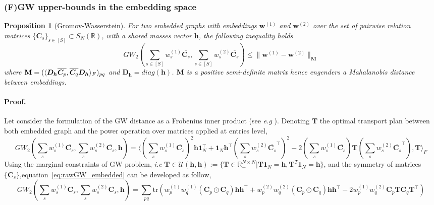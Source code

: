 \documentclass{article}
\newcommand{\scalar}[2]{\langle #1 , #2 \rangle}
\def\eqref#1{equation~\ref{#1}}
\def\vh{{\bm{h}}}
\def\vw{{\bm{w}}}
\def\mC{{\bm{C}}}
\def\mD{{\bm{D}}}
\def\mM{{\bm{M}}}
\def\mT{{\bm{T}}}
\newcommand{\R}{\mathbb{R}}
\def\Mbf{{\bf M}}
\def\R{{\mathbb{R}}}
\def\tr{{\text{tr}}}
\newtheorem{proposition}{Proposition}
\begin{document}
	\subsubsection{(F)GW upper-bounds in the embedding space}
	\begin{proposition}[Gromov-Wasserstein]
		\label{prop:embed_graph}
		For two embedded graphs with embeddings $\vw^{(1)}$ and $\vw^{(2)}$ over the set of pairwise relation matrices $\{\overline{\mC_s}\}_{s\in[S]} \subset S_N(\R)$, with a shared masses vector $\vh$, the following inequality holds
		\begin{equation}
		GW_2\left(\sum_{s \in [S]} w^{(1)}_s \overline{\mC_s}, \sum_{s \in [S]} w^{(2)}_s \overline{\mC_s}\right) \leq \|\vw^{(1)} - \vw^{(2)}\|_\mM \label{eq:mah_gw}
		\end{equation}
		where $\Mbf = (\scalar{\mD_{\vh}\overline{\mC_p}}{ \overline{\mC_q}\mD_{\vh}}_{F})_{pq}$ and $\mD_{\vh}= diag(\vh)$. $\mM$ is a positive semi-definite matrix hence engenders a Mahalanobis distance between embeddings.
	\end{proposition}
	\paragraph{Proof.} Let consider the formulation of the GW distance as a Frobenius inner product (see \emph{e.g} \citep{peyre2016gromov}). Denoting $\mT$ the optimal transport plan between both embedded graph and the power operation over matrices applied at entries level, 
	\begin{equation}\label{eq:rawGW_embedded}
	GW_2(\sum_s w^{(1)}_s \overline{\mC_s}, \sum_s w^{(2)}_s \overline{\mC_s},\vh) = \scalar{(\sum_s w_s^{(1)}\overline{\mC_s})^2\vh \mathbf{1}_N^{\top} +\mathbf{1}_N\vh^{\top}(\sum_s w_s^{(2)}\overline{\mC_s}^{\top})^2 - 2(\sum_s w_s^{(1)}\overline{\mC_s}) \mT(\sum_s w_s^{(2)}\overline{\mC_s}^{\top}) }{\mT}_F
	\end{equation}
	Using the marginal constraints of GW problem, \emph{i.e} $\mT \in \mathcal{U}(\vh,\vh):= \{\mT \in \R_{+}^{N\times N}|\mT\mathbf{1}_{N}=\vh, \mT^T\mathbf{1}_{N}=\vh\}$, and the symmetry of matrices $\{\overline{\mC_s}\}$,\eqref{eq:rawGW_embedded} can be developed as follow,
	\begin{equation}\label{eq:GW_embedded1}
	GW_2(\sum_s w^{(1)}_s \overline{\mC_s}, \sum_s w^{(2)}_s \overline{\mC_s},\vh) =  \sum_{pq} \tr\left(w_p^{(1)}w_q^{(1)}(\overline{\mC_p}\odot \overline{\mC_q})\vh\vh^{\top} + w_p^{(2)}w_q^{(2)} (\overline{\mC_p}\odot \overline{\mC_q})\vh\vh^{\top} - 2 w_p^{(1)}w_q^{(2)} \overline{\mC_p}\mT \overline{\mC_q} \mT^{\top}\right)
	\end{equation}
	
\end{document}
